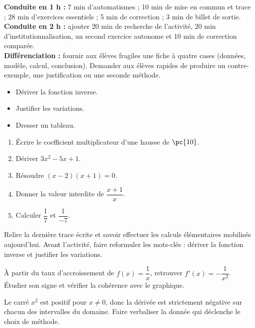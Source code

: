\ifmxteacher
\begin{method}
\textbf{Conduite en 1 h :} 7 min d'automatismes ; 10 min de mise en commun et trace ; 28 min d'exercices essentiels ; 5 min de correction ; 3 min de billet de sortie.\\
\textbf{Conduite en 2 h :} ajouter 20 min de recherche de l'activité, 20 min d'institutionnalisation, un second exercice autonome et 10 min de correction comparée.\\
\textbf{Différenciation :} fournir aux élèves fragiles une fiche à quatre cases (données, modèle, calcul, conclusion). Demander aux élèves rapides de produire un contre-exemple, une justification ou une seconde méthode.
\end{method}
\fi
{}
\begin{objectives}\begin{itemize}\item Dériver la fonction inverse.\item Justifier les variations.\item Dresser un tableau.\end{itemize}\end{objectives}
\begin{fluency}\begin{enumerate}\item Écrire le coefficient multiplicateur d'une hausse de $\pc{10}$. \item Dériver $3x^2-5x+1$. \item Résoudre $(x-2)(x+1)=0$. \item Donner la valeur interdite de $\dfrac{x+1}{x}$. \item Calculer $\dfrac1{7}$ et $\dfrac1{-7}$. \end{enumerate}\end{fluency}
\begin{prerequisites}Relire la dernière trace écrite et savoir effectuer les calculs élémentaires mobilisés aujourd'hui. Avant l'activité, faire reformuler les mots-clés : dériver la fonction inverse et justifier les variations.\end{prerequisites}

\begin{activity}
À partir du taux d'accroissement de $f(x)=\dfrac1x$, retrouver $f'(x)=-\dfrac1{x^2}$. Étudier son signe et vérifier la cohérence avec le graphique.

\end{activity}
\begin{solution}Le carré $x^2$ est positif pour $x\neq0$, donc la dérivée est strictement négative sur chacun des intervalles du domaine. Faire verbaliser la donnée qui déclenche le choix de méthode.\end{solution}

